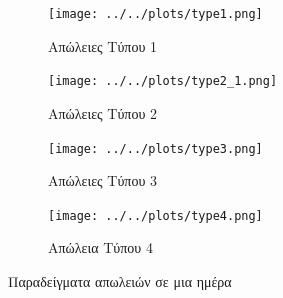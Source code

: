 \begin{figure}[ht!]
\begin{subfigure}[b]{0.5\textwidth}
\texttt{[image: ../../plots/type1.png]}
\caption{Απώλειες Τύπου 1 \label{type1loss}}
\end{subfigure}
\quad
\begin{subfigure}[b]{0.5\textwidth}
\texttt{[image: ../../plots/type2\_1.png]}
\caption{Απώλειες Τύπου 2\label{type2loss}}
\end{subfigure}
\quad
\begin{subfigure}[b]{0.5\textwidth}
\texttt{[image: ../../plots/type3.png]}
\caption{Απώλειες Τύπου 3 \label{type3loss}}
\end{subfigure}
\quad
\begin{subfigure}[b]{0.5\textwidth}
\texttt{[image: ../../plots/type4.png]}
\caption{Απώλεια Τύπου 4 \label{type4loss}}
\end{subfigure}
\caption{Παραδείγματα απωλειών σε μια ημέρα}
\label{losstypes}
\end{figure}
